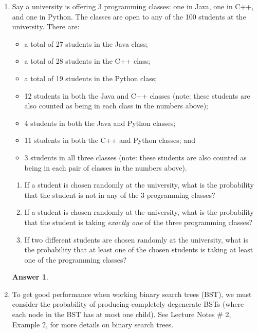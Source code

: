\documentclass[12pt]{article}
\renewcommand{\(}{\left(}
\renewcommand{\)}{\right)}
\theoremstyle{definition}
\newtheorem*{answer}{Answer}
\begin{document}
\begin{enumerate}
\item Say a university is offering 3 programming classes: one in Java, one in C++, and one in Python.  The classes are open to any of the 100 students at the university.  There are:
    \begin{itemize}

    \item a total of 27 students in the Java class;
    \item a total of 28 students in the C++ class;
    \item a total of 19 students in the Python class;
    \item 12 students in both the Java and C++ classes (note: these students are also counted as being in each class in the numbers above);
    \item 4 students in both the Java and Python classes;
    \item 11 students in both the C++ and Python classes; and
    \item 3 students in all three classes (note: these students are also counted as being in each pair of classes in the numbers above).

    \end{itemize}

    \begin{enumerate}[label=\alph*.]

    \item If a student is chosen randomly at the university, what is the probability that the student is not in any of the 3 programming classes?
    \item If a student is chosen randomly at the university, what is the probability that the student is taking \emph{exactly one} of the three programming classes?
    \item If two different students are chosen randomly at the university, what is the probability that at least one of the chosen students is taking at least one of the programming classes?

    \end{enumerate}

    \begin{shaded}
    \begin{answer}

    \end{answer}
    \end{shaded}
    \newpage


\item To get good performance when working binary search trees (BST), we must consider the probability of producing completely degenerate BSTs (where each node in the BST has at most one child). See Lecture Notes \# 2, Example 2, for more details on binary search trees.
    \begin{enumerate}[label=\alph*.]


\end{enumerate}
\end{enumerate}
\end{document}
